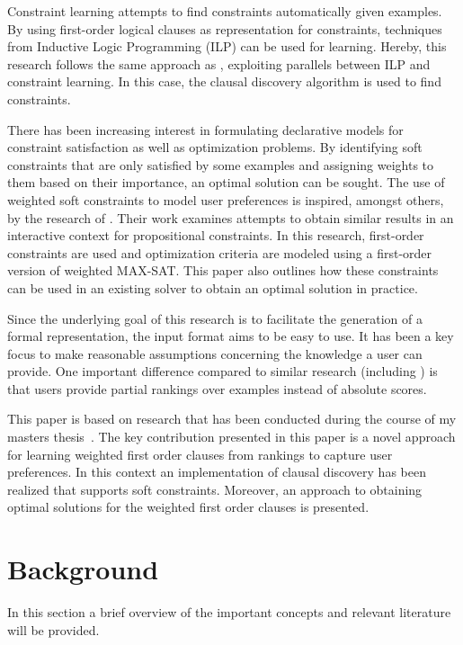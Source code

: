 \documentclass[letterpaper]{article}
\theoremstyle{definition}
\begin{document}
Constraint learning attempts to find constraints automatically given examples.
By using first-order logical clauses as representation for constraints, techniques from Inductive Logic Programming (ILP) can be used for learning.
Hereby, this research follows the same approach as \cite{Lallouet:LearningCP}, exploiting parallels between ILP and constraint learning.
In this case, the clausal discovery algorithm \cite{DeRaedt:ClausalDiscovery} is used to find constraints.

There has been increasing interest in formulating declarative models for constraint satisfaction as well as optimization problems.
By identifying soft constraints that are only satisfied by some examples and assigning weights to them based on their importance, an optimal solution can be sought.
The use of weighted soft constraints to model user preferences is inspired, amongst others, by the research of \cite{campigotto2011active}.
Their work examines attempts to obtain similar results in an interactive context for propositional constraints.
In this research, first-order constraints are used and optimization criteria are modeled using a first-order version of weighted MAX-SAT.
This paper also outlines how these constraints can be used in an existing solver to obtain an optimal solution in practice.

Since the underlying goal of this research is to facilitate the generation of a formal representation, the input format aims to be easy to use.
It has been a key focus to make reasonable assumptions concerning the knowledge a user can provide.
One important difference compared to similar research (including \cite{campigotto2011active}) is that users provide partial rankings over examples instead of absolute scores.

This paper is based on research that has been conducted during the course of my masters thesis~\cite{kolb2015thesis}.
The key contribution presented in this paper is a novel approach for learning weighted first order clauses from rankings to capture user preferences.
In this context an implementation of clausal discovery has been realized that supports soft constraints.
Moreover, an approach to obtaining optimal solutions for the weighted first order clauses is presented.


\section{Background}
In this section a brief overview of the important concepts and relevant literature will be provided.
\end{document}

